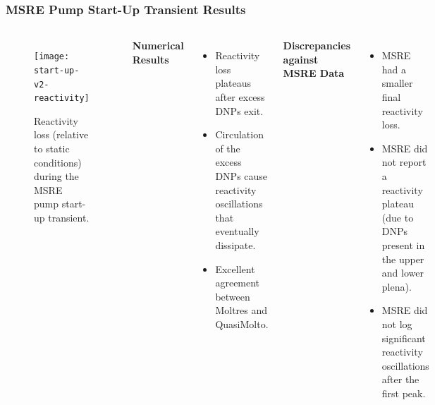 \begin{frame}
  \frametitle{MSRE Pump Start-Up Transient Results}
  \begin{columns}
  \column{5.5cm}
  \begin{figure}[t]
    \centering
    \texttt{[image: start-up-v2-reactivity]}
    \caption{Reactivity loss (relative to static conditions) during the \gls{MSRE} pump
    start-up transient.}
    \label{fig:start-up-reactivity}
  \end{figure}
  \column{5.5cm}
  \textbf{Numerical Results}
  \begin{itemize}
    \item Reactivity loss plateaus after excess DNPs exit.
    \item Circulation of the excess DNPs cause reactivity oscillations that eventually dissipate.
    \item Excellent agreement between Moltres and QuasiMolto.
  \end{itemize}
  \pause
  \textbf{Discrepancies against MSRE Data}
  \begin{itemize}
    \item MSRE had a smaller final reactivity loss.
    \item MSRE did not report a reactivity plateau (due to DNPs present in the upper and lower plena).
    \item MSRE did not log significant reactivity oscillations after the first peak.
  \end{itemize}
  \end{columns}
\end{frame}


